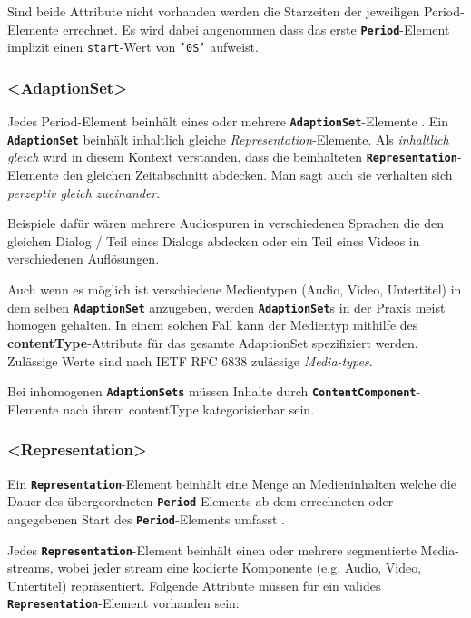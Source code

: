 \documentclass[paper = a4, fontsize = 12pt, parskip = half]{scrartcl} %
\def\attr#1{\texttt{#1}}
\def\elem#1{\texttt{\textbf{#1}}}
\begin{document}
Sind beide Attribute nicht vorhanden werden die Starzeiten der jeweiligen Period-Elemente errechnet. Es wird dabei angenommen dass das erste \elem{Period}-Element implizit einen \attr{start}-Wert von \attr{'0S'} aufweist.

\subsubsection{<AdaptionSet>}
Jedes Period-Element beinhält eines oder mehrere \elem{AdaptionSet}-Elemente \cite{international_organization_for_standardization_isoiec_nodate}. Ein \elem{AdaptionSet} beinhält inhaltlich gleiche \textit{Representation}-Elemente. Als \textit{inhaltlich gleich} wird in diesem Kontext verstanden, dass die beinhalteten \elem{Representation}-Elemente den gleichen Zeitabschnitt abdecken. Man sagt auch sie verhalten sich \textit{perzeptiv gleich zueinander}.

Beispiele dafür wären mehrere Audiospuren in verschiedenen Sprachen die den gleichen Dialog / Teil eines Dialogs abdecken oder ein Teil eines Videos in verschiedenen Auflösungen.

Auch wenn es möglich ist verschiedene Medientypen (Audio, Video, Untertitel) in dem selben \elem{AdaptionSet} anzugeben, werden \elem{AdaptionSet}s in der Praxis meist homogen gehalten. In einem solchen Fall kann der Medientyp mithilfe des \textbf{contentType}-Attributs für das gesamte AdaptionSet spezifiziert werden. Zulässige Werte sind nach IETF RFC 6838 zulässige \textit{Media-types}.

Bei inhomogenen \elem{AdaptionSets} müssen Inhalte durch \elem{ContentComponent}-Elemente nach ihrem contentType kategorisierbar sein.

\subsubsection{<Representation>}
Ein \elem{Representation}-Element beinhält eine Menge an Medieninhalten welche die Dauer des übergeordneten \elem{Period}-Elements ab dem errechneten oder angegebenen Start des \elem{Period}-Elements umfasst \cite{international_organization_for_standardization_isoiec_nodate}.

Jedes \elem{Representation}-Element beinhält einen oder mehrere segmentierte Media-streams, wobei jeder stream eine kodierte Komponente (e.g. Audio, Video, Untertitel) repräsentiert. Folgende Attribute müssen für ein valides \elem{Representation}-Element vorhanden sein:
\end{document}
